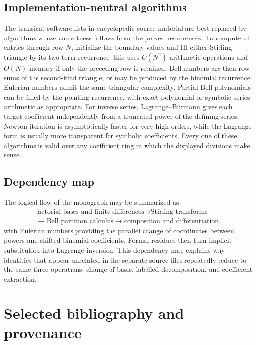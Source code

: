 \documentclass[11pt,a4paper,oneside,openany]{book}
\theoremstyle{definition}
\theoremstyle{remark}
\begin{document}
\section{Implementation-neutral algorithms}
The transient software lists in encyclopedic source material are best replaced by
algorithms whose correctness follows from the proved recurrences.  To compute all
entries through row $N$, initialize the boundary values and fill either Stirling
triangle by its two-term recurrence; this uses $O(N^2)$ arithmetic operations and
$O(N)$ memory if only the preceding row is retained.  Bell numbers are then row
sums of the second-kind triangle, or may be produced by the binomial recurrence.
Eulerian numbers admit the same triangular complexity.  Partial Bell polynomials
can be filled by the pointing recurrence, with exact polynomial or symbolic-series
arithmetic as appropriate.  For inverse series, Lagrange--Bürmann gives each target
coefficient independently from a truncated power of the defining series; Newton
iteration is asymptotically faster for very high orders, while the Lagrange form is
usually more transparent for symbolic coefficients.  Every one of these algorithms
is valid over any coefficient ring in which the displayed divisions make sense.

\section{Dependency map}
The logical flow of the monograph may be summarized as
\[
\begin{gathered}
 \text{factorial bases and finite differences}
 \longrightarrow \text{Stirling transforms}\\
 \longrightarrow \text{Bell partition calculus}
 \longrightarrow \text{composition and differentiation}.
\end{gathered}
\]
with Eulerian numbers providing the parallel change of coordinates between powers
and shifted binomial coefficients.  Formal residues then turn implicit substitution
into Lagrange inversion.  This dependency map explains why identities that appear
unrelated in the separate source files repeatedly reduce to the same three
operations: change of basis, labelled decomposition, and coefficient extraction.

\backmatter

\chapter*{Selected bibliography and provenance}
\end{document}
